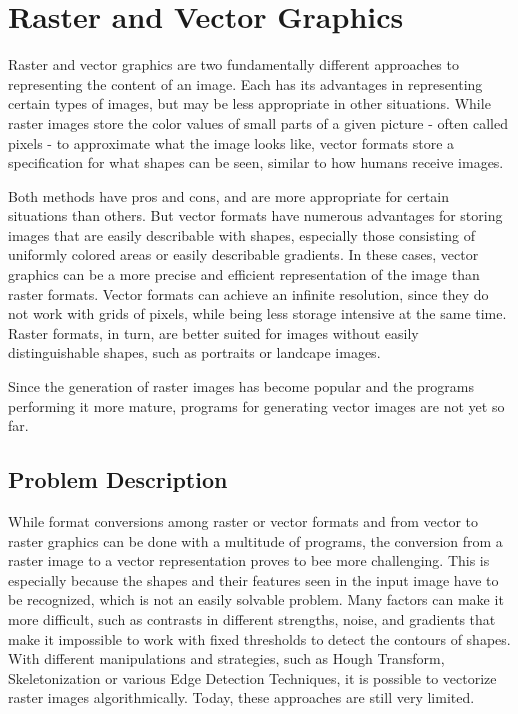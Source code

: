\documentclass[12pt, a4paper, titlepage]{report}
\begin{document}
\section{Raster and Vector Graphics}

Raster and vector graphics are two fundamentally different approaches to representing the content of an image. Each has its advantages in representing certain types of images, but may be less appropriate in other situations. While raster images store the color values of small parts of a given picture - often called pixels - to approximate what the image looks like, vector formats store a specification for what shapes can be seen, similar to how humans receive images.

Both methods have pros and cons, and are more appropriate for certain situations than others. But vector formats have numerous advantages for storing images that are easily describable with shapes, especially those consisting of uniformly colored areas or easily describable gradients. In these cases, vector graphics can be a more precise and efficient representation of the image than raster formats. Vector formats can achieve an infinite resolution, since they do not work with grids of pixels, while being less storage intensive at the same time. Raster formats, in turn, are better suited for images without easily distinguishable shapes, such as portraits or landcape images.

Since the generation of raster images has become popular and the programs performing it more mature, programs for generating vector images are not yet so far.

\subsection{Problem Description}

While format conversions among raster or vector formats and from vector to raster graphics can be done with a multitude of programs, the conversion from a raster image to a vector representation proves to bee more challenging. This is especially because the shapes and their features seen in the input image have to be recognized, which is not an easily solvable problem. Many factors can make it more difficult, such as contrasts in different strengths, noise, and gradients that make it impossible to work with fixed thresholds to detect the contours of shapes. With different manipulations and strategies, such as Hough Transform, Skeletonization or various Edge Detection Techniques, it is possible to vectorize raster images algorithmically. Today, these approaches are still very limited.
\end{document}
